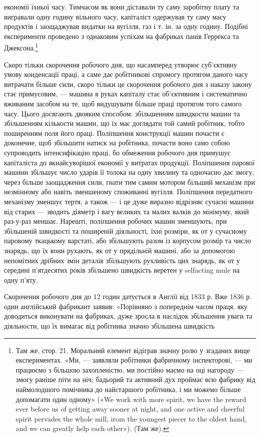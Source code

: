 \parcont{}  %
економії їхньої часу. Тимчасом як вони діставали ту саму заробітну
плату та вигравали одну годину вільного часу, капіталіст
одержував ту саму масу продуктів і заощаджував видатки на
вугілля, газ і т. ін. за одну годину. Подібні експерименти проведено
з однаковим успіхам на фабриках панів Геррекса та
Джексона.\footnote{
Там же, стор. 21. Моральний елемент відіграв значну ролю у
згаданих вище експериментах. «Ми, — заявляли робітники фабричному
інспекторові, — ми працюємо з більшою захопленістю, ми постійно маємо
на оці нагороду — змогу раніше піти на ніч; бадьорий та активний
дух проймає всю фабрику від наймолодшого помічника до найстаршого
робітника, і ми можемо більше допомагати один одному» («We work with
more spirit, we have the reward ever before us of getting away sooner at
night, and one active and cheerful spirit pervades the whole mill, irom the
youngest piecer to the oldest hand, and we can greatly help each other»).
(Там же).
}

Скоро тільки скорочення робочого дня, що насамперед утворює
суб’єктивну умову конденсації праці, а саме дає робітникові
спромогу протягом даного часу витрачати більше сили, скоро
тільки це скорочення робочого дня з наказу закону стає примусовим,
— машина в руках капіталу стає об’єктивним і систематично
вживаним засобом на те, щоб видушувати більше праці
протягом того самого часу. Цього досягають двояким способом:
збільшенням швидкости машин та збільшенням кількости машин,
що їх має доглядати той самий робітник, тобто поширенням поля
його праці. Поліпшення конструкції машин почасти є доконечне,
щоб збільшити натиск на робітника, почасти воно само собою
супроводить інтенсифікацію праці, бо обмеження робочого дня
примушує капіталіста до якнайсуворішої економії у витратах
продукції. Поліпшення парової машини збільшує число ударів
її толока на одну хвилину та одночасно дає змогу, через більше
заощадження сили, гнати тим самим мотором більший механізм
при незмінному або навіть зменшеному споживанні вугілля.
Поліпшення передатного механізму зменшує тертя, а також — і це
дуже виразно відрізняє сучасні машини від старих — зводить
діяметр і вагу великих та малих валків до мінімуму, який раз-у-раз
меншає. Нарешті, поліпшення робочих машин зменшують,
при збільшеній швидкості та поширеній діяльності, їхні розміри,
як от у сучасному паровому ткацькому варстаті, або збільшують
разом із корпусом розмір та число знарядь, що їх вони рухають,
як от у прядільній машині, або за допомогою непомітних дрібних
змін деталів збільшують рухливість цих знарядь, як от у середині
п’ятдесятих років збільшено швидкість веретен у selfacting mule
на одну п’яту.

Скорочення робочого дня до 12 годин датується в Англії від
1833 р. Вже 1836 р. один англійський фабрикант заявив: «Порівняно
з попереднім часом праця, яку доводиться виконувати на
фабриках, дуже зросла в наслідок збільшення уваги та діяльности,
що їх вимагає від робітника значно збільшена швидкість
\parbreak{}  %
